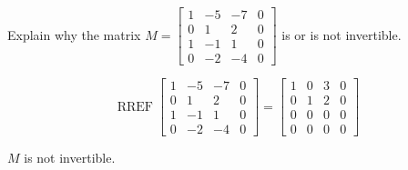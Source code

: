 
\begin{exerciseStatement}


Explain why the matrix \(M= \left[\begin{array}{cccc}
1 & -5 & -7 & 0 \\
0 & 1 & 2 & 0 \\
1 & -1 & 1 & 0 \\
0 & -2 & -4 & 0
\end{array}\right] \) is or is not invertible.


\end{exerciseStatement}
    
\begin{exerciseAnswer} 


\[\operatorname{RREF} \left[\begin{array}{cccc}
1 & -5 & -7 & 0 \\
0 & 1 & 2 & 0 \\
1 & -1 & 1 & 0 \\
0 & -2 & -4 & 0
\end{array}\right] = \left[\begin{array}{cccc}
1 & 0 & 3 & 0 \\
0 & 1 & 2 & 0 \\
0 & 0 & 0 & 0 \\
0 & 0 & 0 & 0
\end{array}\right] \]

\(M\) is not invertible.
\end{exerciseAnswer}
    
